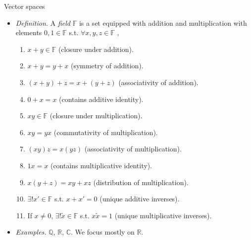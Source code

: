 \documentclass{beamer}
\numberwithin{equation}{section}
\begin{document}
\begin{frame}{Vector spaces}
    \begin{itemize}
        \item
        \textit{Definition.} A \textit{field} $ \mathbb{F} $ is a set equipped
        with addition and multiplication with elements $ 0, 1 \in \mathbb{F} $
        s.t. $ \forall x, y, z \in \mathbb{F} $ \cite{jacob_linalg},
        \begin{enumerate}
            \item
            $ x + y \in \mathbb{F} $ (closure under addition).

            \item
            $ x + y = y + x $ (symmetry of addition).

            \item
            $ (x + y) + z = x + (y + z) $ (associativity of addition).

            \item
            $ 0 + x = x $ (contains additive identity).

            \item
            $ xy \in \mathbb{F} $ (closure under multiplication).

            \item
            $ xy = yx $ (commutativity of multiplication).

            \item
            $ (xy)z = x(yz) $ (associativity of multiplication).

            \item
            $ 1x = x $ (contains multiplicative identity).

            \item
            $ x(y + z) = xy + xz $ (distribution of multiplication).

            \item
            $ \exists!x' \in \mathbb{F} $ s.t. $ x + x' = 0 $ (unique additive
            inverses).

            \item
            If $ x \ne 0 $, $ \exists!\tilde{x} \in \mathbb{F} $ s.t.
            $ x\tilde{x} = 1 $ (unique multiplicative inverses).
        \end{enumerate}

        \item
        \textit{Examples.} $ \mathbb{Q} $, $ \mathbb{R} $, $ \mathbb{C} $. We
        focus mostly on $ \mathbb{R} $.
    \end{itemize}
\end{frame}
\end{document}
